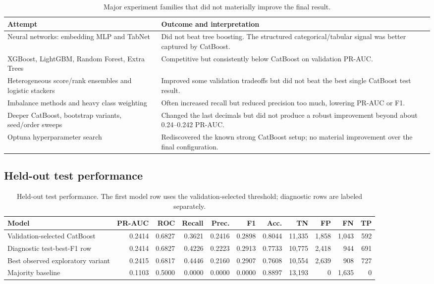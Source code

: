 \documentclass[10pt]{article}
\newcommand{\tightsubsection}[1]{\vspace{2pt}\subsection{#1}\vspace{-3pt}}
\begin{document}
\begin{table}[H]
\centering
\caption{Major experiment families that did not materially improve the final result.}
\small
\begin{tabularx}{0.98\textwidth}{p{2.1in}Y}
\toprule
Attempt & Outcome and interpretation \\
\midrule
Neural networks: embedding MLP and TabNet & Did not beat tree boosting. The structured categorical/tabular signal was better captured by CatBoost. \\
XGBoost, LightGBM, Random Forest, Extra Trees & Competitive but consistently below CatBoost on validation PR-AUC. \\
Heterogeneous score/rank ensembles and logistic stackers & Improved some validation tradeoffs but did not beat the best single CatBoost test result. \\
Imbalance methods and heavy class weighting & Often increased recall but reduced precision too much, lowering PR-AUC or F1. \\
Deeper CatBoost, bootstrap variants, seed/order sweeps & Changed the last decimals but did not produce a robust improvement beyond about 0.24--0.242 PR-AUC. \\
Optuna hyperparameter search & Rediscovered the known strong CatBoost setup; no material improvement over the final configuration. \\
\bottomrule
\end{tabularx}
\end{table}

\tightsubsection{Held-out test performance}

\begin{table}[H]
\centering
\caption{Held-out test performance. The first model row uses the validation-selected threshold; diagnostic rows are labeled separately.}
\scriptsize
\begin{tabularx}{0.98\textwidth}{Yrrrrrrrrrr}
\toprule
Model & PR-AUC & ROC & Recall & Prec. & F1 & Acc. & TN & FP & FN & TP \\
\midrule
Validation-selected CatBoost & 0.2414 & 0.6827 & 0.3621 & 0.2416 & 0.2898 & 0.8044 & 11,335 & 1,858 & 1,043 & 592 \\
Diagnostic test-best-F1 row & 0.2414 & 0.6827 & 0.4226 & 0.2223 & 0.2913 & 0.7733 & 10,775 & 2,418 & 944 & 691 \\
Best observed exploratory variant & 0.2415 & 0.6817 & 0.4446 & 0.2160 & 0.2907 & 0.7608 & 10,554 & 2,639 & 908 & 727 \\
Majority baseline & 0.1103 & 0.5000 & 0.0000 & 0.0000 & 0.0000 & 0.8897 & 13,193 & 0 & 1,635 & 0 \\
\bottomrule
\end{tabularx}
\end{table}
\end{document}
